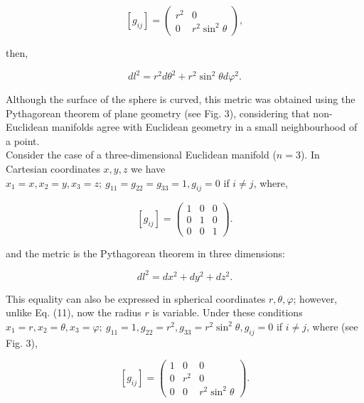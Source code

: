 \documentclass[11pt,letterpaper]{article}
\begin{document}
\begin{equation} %
\left[g_{ij} \right] = 
\begin{pmatrix}
r^{2} & 0\\
0 & r^{2}\sin^{2}\theta 
\end{pmatrix},
\end{equation}

then,

\begin{equation}%
dl^{2} = r^{2}d\theta^{2} + r^{2}\sin^{2}\theta d\varphi^{2}.
\end{equation}

Although the surface of the sphere is curved, this metric was obtained using the Pythagorean theorem of plane geometry (see Fig. 3), considering that non-Euclidean manifolds agree with Euclidean geometry in a small neighbourhood of a point.\\

Consider the case of a three-dimensional Euclidean manifold ($n = 3$). In Cartesian coordinates $x,y,z$ we have $x_{1} = x, x_{2} = y, x_{3} = z;\ g_{11} =  g_{22}= g_{33} = 1, g_{ij} = 0$ if $i \neq j$, where,

\begin{equation} %
\left[g_{ij} \right] = 
\begin{pmatrix}
1 & 0 & 0\\
0 & 1 & 0\\
0 & 0 & 1
\end{pmatrix}.
\end{equation}

and the metric is the Pythagorean theorem in three dimensions:

\begin{equation}%
dl^{2} = dx^{2}+ dy^{2} + dz^{2}.
\end{equation}

This equality can also be expressed in spherical coordinates $r,\theta,\varphi$; however, unlike Eq. (11), now the radius $r$ is variable. Under these conditions $x_{1} = r, x_{2} = \theta, x_{3} = \varphi;\ g_{11} = 1, g_{22}=r^{2} ,g_{33} = r^{2}\sin^{2}\theta, g_{ij} = 0$ if $i \neq j$, where (see Fig. 3),

\begin{equation} %
\left[g_{ij} \right] = 
\begin{pmatrix}
1 & 0 & 0\\
0 & r^{2} & 0\\
0 & 0 & r^{2}\sin^{2}\theta
\end{pmatrix}.
\end{equation}
\end{document}

